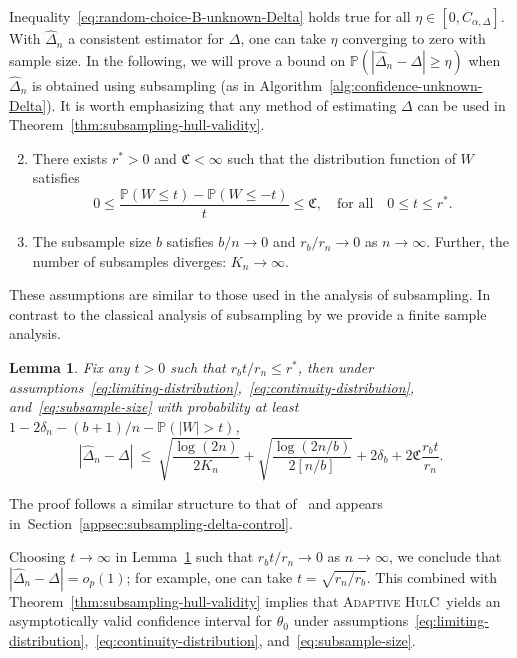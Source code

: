 \documentclass{article}
\newcommand{\ahulc}{\textsc{Adaptive HulC}~}
\newtheorem{lem}{Lemma}
\numberwithin{myalgctr}{section}
\begin{document}
Inequality~\eqref{eq:random-choice-B-unknown-Delta} holds true for all $\eta\in[0, C_{\alpha,\Delta}]$. With $\widehat{\Delta}_n$ a consistent estimator for $\Delta$, one can take $\eta$ converging to zero with sample size. In the following, we will prove a bound on $\mathbb{P}(|\widehat{\Delta}_n - \Delta| \ge \eta)$ when $\widehat{\Delta}_n$ is obtained using subsampling (as in Algorithm~\ref{alg:confidence-unknown-Delta}). It is worth emphasizing that any method of estimating $\Delta$ can be used in Theorem~\ref{thm:subsampling-hull-validity}. 


\begin{enumerate}[label = \bf(A\arabic*)]
\setcounter{enumi}{1}
  \item There exists $r^* > 0$ and $\mathfrak{C} < \infty$ such that the distribution function of $W$ satisfies\label{eq:continuity-distribution}
  \[
  0 \le \frac{\mathbb{P}(W \le t) - \mathbb{P}(W \le -t)}{t} \le \mathfrak{C},\quad\mbox{for all}\quad 0 \le t \le r^*.
  \]
  \item The subsample size $b$ satisfies $b/n\to0$ and $r_b/r_n\to0$ as $n\to\infty$. Further, the number of subsamples diverges: $K_n\to\infty$.\label{eq:subsample-size}
\end{enumerate}
These assumptions are similar to those used in the analysis of subsampling. In contrast to the classical analysis of subsampling by \citet{politis1994large} we provide a
finite sample analysis. 
\begin{lem}\label{lem:subsampling-delta-control}
Fix any $t > 0$ such that $r_bt/r_n \le r^*$, then under assumptions~\ref{eq:limiting-distribution},~\ref{eq:continuity-distribution}, and~\ref{eq:subsample-size} 
with probability at least $1 - 2\delta_n - (b + 1)/n - \mathbb{P}(|W| > t)$,
\[
|\widehat{\Delta}_n - \Delta| ~\le~ \sqrt{\frac{\log(2n)}{2K_n}} + \sqrt{\frac{\log(2n/b)}{2[n/b]}} + 2\delta_b + 2\mathfrak{C}\frac{r_bt}{r_n}.
\]
\end{lem}
\noindent The proof follows a similar structure to that of~\cite{politis1994large} and appears in~Section~\ref{appsec:subsampling-delta-control}.

Choosing $t\to\infty$ in Lemma~\ref{lem:subsampling-delta-control} such that $r_bt/r_n\to0$ as $n\to\infty$, we conclude that $|\widehat{\Delta}_n - \Delta| = o_p(1)$; for example, one can take $t = \sqrt{r_n/r_b}$. This combined with Theorem~\ref{thm:subsampling-hull-validity} implies that \ahulc yields an asymptotically valid confidence interval for $\theta_0$ under assumptions~\ref{eq:limiting-distribution},~\ref{eq:continuity-distribution}, and~\ref{eq:subsample-size}.
\end{document}
